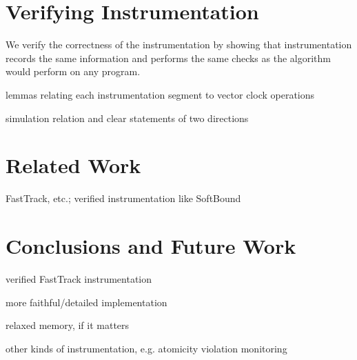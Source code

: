\documentclass[preprint, 10pt]{sigplanconf}
\begin{document}
\section{Verifying Instrumentation}
We verify the correctness of the instrumentation by showing that instrumentation records the same information and performs the same checks as the algorithm would perform on any program.

lemmas relating each instrumentation segment to vector clock operations

simulation relation and clear statements of two directions

\section{Related Work}
FastTrack, etc.; verified instrumentation like SoftBound

\section{Conclusions and Future Work}
verified FastTrack instrumentation

more faithful/detailed implementation

relaxed memory, if it matters

other kinds of instrumentation, e.g. atomicity violation monitoring




\end{document}
